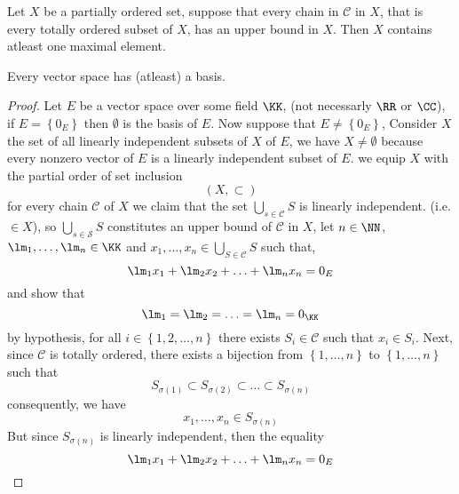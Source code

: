 % 
% 

\lecday[2025-05-06]

% 

\begin{theorem}
	Let $X $ be a partially ordered set,
	suppose that every chain in $\mathcal{C}  $ in 
	$X $, that is every totally ordered subset of $X $, has an 
	upper bound in $X$. Then $X $ contains atleast
	one maximal element.
\end{theorem}

	\begin{theorem}[]
	Every vector space has (atleast) a basis.
	\end{theorem}
	\begin{proof}
		Let $E $ be a vector space over some field 
		$\KK $, (not necessarly $\RR  $ or $\CC  $), 
		if $E = \left\{ 0_{E} \right\} $  then 
		$\emptyset  $ is the basis of $E $.
		Now suppose that $E  \neq  \left\{ 0_{E} \right\} $,
		Consider $X $ the set 
		of all linearly independent subsets of 
		$X$ of $E$, we have 
		$X \neq \emptyset  $  because every nonzero 
		vector of $E $ is a linearly independent 
		subset of $E$. we equip $X $ with the 
		partial order of set inclusion 
		\[
			(X, \subset) 
		\]
		for every chain $\mathcal{C}$ of $X$ 
		we claim that the set $\bigcup_{ s \in  \mathcal{C} }^{}  
		S$ is  linearly independent. 
		(i.e. $\in  X $), so 
		$\bigcup_{s \in  \mathcal{S} }^{}  S$ constitutes 
		an upper bound of $\mathcal{C}  $  in $X $, 
		let $n \in \NN $, $\lm_1, \hdots , \lm_{n} \in  \KK $ 
		and $x_1, \hdots , x_{n} \in \bigcup_{S \in  \mathcal{C} }^{} S$   
		such that, 
		\[
		\lm_1 x_1 + \lm_2 x_2 + \hdots + 
		\lm_n x_n  = 0_{E}
		\]
		and show that 
		\[
		\lm_1 = \lm_2 = \hdots  = \lm_n = 0_{\KK}
		\]
		by hypothesis, for all 
		$i \in  \left\{ 1,2, \hdots , n \right\} $  
		there exists $S_{i} \in \mathcal{C} $ such that 
		$x_{i} \in  S_{i} $. Next, since $\mathcal{C}  $  
		is totally ordered, there exists a bijection 
		from $\left\{ 1, \hdots , n \right\} $  
		to $\left\{ 1, \hdots , n  \right\} $  
		such that 
		\[
		S_{\sigma (1)   } \subset 
		S_{\sigma (2)   } \subset 
		\hdots 
		\subset S_{\sigma (n)   }
		\]
		consequently, we have 
		\[
		x_1, \hdots , x_{n} \in  S_{\sigma (n)   } 
		\]
		But since $S_{\sigma (n)   } $  
		is linearly independent, 
		then the equality 
		\[
		\lm_1 x_1 + \lm_2 x_2 + \hdots + \lm_n x_{n} = 0_{E}
		\]                                    

\end{proof}
